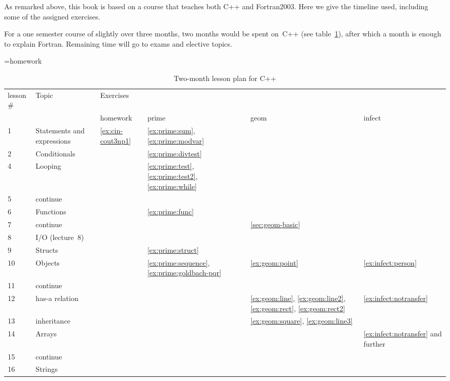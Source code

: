 As remarked above, this book is based on a course that teaches both
C++ and Fortran2003. Here we give the timeline used, including some of
the assigned exercises.

For a one semester course of slightly over three months, two months
would be spent on~C++ (see table~\ref{tab:c++plan}), after which a
month is enough to explain Fortran. Remaining time will go to exams
and elective topics.

\begin{table}[ht]
  =\hbox{homework }\edef\colwidth{\the\wd0}
  \begin{tabular}{|l|p{\colwidth}|p{\colwidth}p{\colwidth}p{\colwidth}p{\colwidth}|}
    \hline
    lesson$\#$&Topic&Exercises&&&\\
    &&homework&prime&geom&infect\\
    \hline
    1 & Statements and expressions
        &\ref{ex:cin-cout3np1}&\ref{ex:prime:sum}, \ref{ex:prime:modvar}&&\\
    2 & Conditionals&
        &\ref{ex:prime:divtest}&&\\
    4 & Looping
        &&\ref{ex:prime:test}, \ref{ex:prime:test2}, \ref{ex:prime:while}&&\\
    5 & continue
        &&&&\\
    6 & Functions
        &&\ref{ex:prime:func}&&\\
    7 & continue
        &&&\ref{sec:geom-basic}&\\
    8 & I/O (lecture~8)
        &&&&\\
    9 & Structs
        &&\ref{ex:prime:struct}&&\\
    10 & Objects
        &&\ref{ex:prime:sequence}, \ref{ex:prime:goldbach-pqr}&
        \ref{ex:geom:point}&\ref{ex:infect:person}\\
    11 & continue
        &&&&\\
    12 & has-a relation
        &&&\ref{ex:geom:line}, \ref{ex:geom:line2},
        \ref{ex:geom:rect}, \ref{ex:geom:rect2}&\ref{ex:infect:notransfer}\\
    13 & inheritance
        &&&\ref{ex:geom:square}, \ref{ex:geom:line3}&\\
    14 & Arrays
        &&&&\ref{ex:infect:notransfer} and further\\
    15 & continue
        &&&&\\
    16 & Strings
        &&&&\\
    \hline
  \end{tabular}
  \caption{Two-month lesson plan for C++}
  \label{tab:c++plan}
\end{table}

